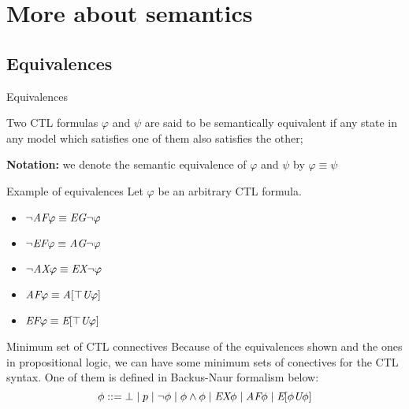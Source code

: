 \section{More about semantics}
\subsection{Equivalences}

\begin{frame}{Equivalences}
	\begin{definition}
		Two CTL formulas $\varphi$ and $\psi$ are said to be \alert{semantically	equivalent} if any state in any model which satisfies one of them also satisfies the other; 
	\end{definition}\pause
	\textbf{Notation:} we denote the semantic equivalence of $\varphi$ and $\psi$ by $\varphi \equiv \psi$
\end{frame}

\begin{frame}{Example of equivalences}
    Let $\varphi$ be an arbitrary CTL formula.
        
    \begin{itemize}
        \item
        {
            $\neg \textit{A}\textit{F} \varphi \equiv \textit{E}\textit{G} \neg \varphi $    
            \pause
        }
        \item
        {
            $\neg \textit{E}\textit{F} \varphi \equiv \textit{A}\textit{G} \neg \varphi$    
            \pause    
        }
        \item
        {
            $\neg \textit{A}\textit{X} \varphi \equiv \textit{E}\textit{X} \neg \varphi$    
            \pause
        }
        \item
        {
            $\textit{A}\textit{F}\varphi \equiv \textit{A}[\top \textit{U}\varphi]$    
            \pause
        }
        \item
        {
            $\textit{E}\textit{F} \varphi \equiv \textit{E}[\top \textit{U}\varphi]$
        }
    \end{itemize}
\end{frame}

\begin{frame}{Minimum set of CTL connectives}
    Because of the equivalences shown and the ones in propositional logic, we can have some minimum sets of conectives for the CTL syntax. One of them is defined in Backus-Naur formalism below:
    $$\phi ::=  \bot \; | \; p \; | \; \neg \phi \; | \; \phi \land \phi \; | \; \textit{E}\textit{X} \phi \; | \;  \textit{A}\textit{F}\phi \; | \; \textit{E}[\phi\textit{U}\phi]$$
\end{frame}